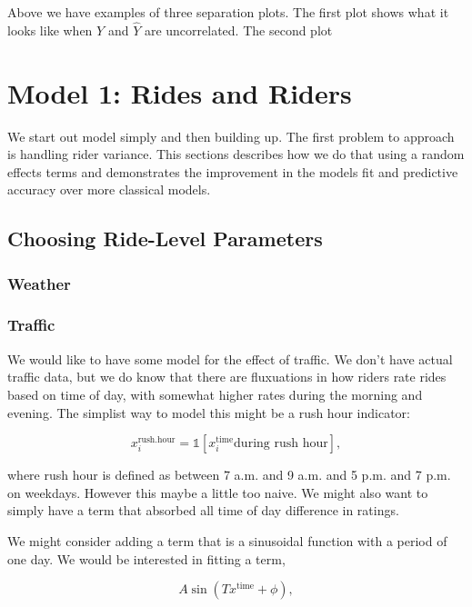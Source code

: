 \documentclass[12pt,twoside]{reedthesis}
\begin{document}
  Above we have examples of three separation plots. The first plot shows
  what it looks like when \(Y\) and \(\hat{Y}\) are uncorrelated. The
  second plot
  
  \chapter{Model 1: Rides and Riders}\label{model-1-rides-and-riders}
  
  We start out model simply and then building up. The first problem to
  approach is handling rider variance. This sections describes how we do
  that using a random effects terms and demonstrates the improvement in
  the models fit and predictive accuracy over more classical models.
  
  \section{Choosing Ride-Level
  Parameters}\label{choosing-ride-level-parameters}
  
  \subsection{Weather}\label{weather}
  
  \subsection{Traffic}\label{traffic}
  
  We would like to have some model for the effect of traffic. We don't
  have actual traffic data, but we do know that there are fluxuations in
  how riders rate rides based on time of day, with somewhat higher rates
  during the morning and evening. The simplist way to model this might be
  a rush hour indicator:
  
  \[ x_i^{\text{rush.hour}} = 
  \mathds{1} [x_i^{\text{time}} \text{during rush hour}],
  \]
  
  where rush hour is defined as between 7 a.m. and 9 a.m. and 5 p.m. and 7
  p.m. on weekdays. However this maybe a little too naive. We might also
  want to simply have a term that absorbed all time of day difference in
  ratings.
  
  We might consider adding a term that is a sinusoidal function with a
  period of one day. We would be interested in fitting a term,
  
  \[A \sin (T x^{\text{time}} + \phi),\]
  
\end{document}
